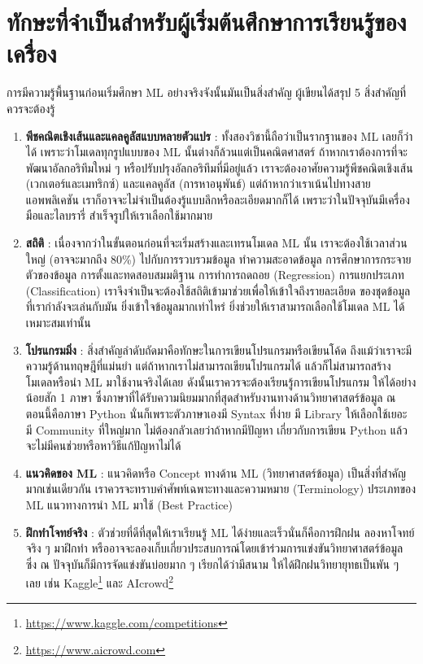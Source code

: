 \section{ทักษะที่จำเป็นสำหรับผู้เริ่มต้นศึกษาการเรียนรู้ของเครื่อง}

การมีความรู้พื้นฐานก่อนเริ่มศึกษา ML อย่างจริงจังนั้นมันเป็นสิ่งสำคัญ ผู้เขียนได้สรุป 5 สิ่งสำคัญที่ควรจะต้องรู้ 

\begin{enumerate}
    \item \textbf{พีชคณิตเชิงเส้นและแคลคูลัสแบบหลายตัวแปร} : ทั้งสองวิชานี้ถือว่าเป็นรากฐานของ ML เลยก็ว่าได้ 
    เพราะว่าโมเดลทุกรูปแบบของ ML นั้นต่างก็ล้วนแต่เป็นคณิตศาสตร์ ถ้าหากเราต้องการที่จะพัฒนาอัลกอริทึมใหม่ ๆ 
    หรือปรับปรุงอัลกอริทึมที่มีอยู่แล้ว เราจะต้องอาศัยความรู้พีชคณิตเชิงเส้น (เวกเตอร์และเมทริกซ์) และแคลคูลัส (การหาอนุพันธ์) 
    แต่ถ้าหากว่าเราเน้นไปทางสายแอพพลิเคชัน เราก็อาจจะไม่จำเป็นต้องรู้แบบลึกหรือละเอียดมากก็ได้ เพราะว่าในปัจจุบันมีเครื่องมือและไลบรารี่%
    สำเร็จรูปให้เราเลือกใช้มากมาย
    \item \textbf{สถิติ} : เนื่องจากว่าในขั้นตอนก่อนที่จะเริ่มสร้างและเทรนโมเดล ML นั้น เราจะต้องใช้เวลาส่วนใหญ่ 
    (อาจจะมากถึง 80\%) ไปกับการรวบรวมข้อมูล ทำความสะอาดข้อมูล การศึกษาการกระจายตัวของข้อมูล การตั้งและทดสอบสมมติฐาน 
    การทำการถดถอย (Regression) การแยกประเภท (Classification) เราจึงจำเป็นจะต้องใช้สถิติเข้ามาช่วยเพื่อให้เข้าใจถึงรายละเอียด
    ของชุดข้อมูลที่เรากำลังจะเล่นกับมัน ยิ่งเข้าใจข้อมูลมากเท่าไหร่ ยิ่งช่วยให้เราสามารถเลือกใช้โมเดล ML ได้เหมาะสมเท่านั้น 
    \item \textbf{โปรแกรมมิ่ง} : สิ่งสำคัญลำดับถัดมาคือทักษะในการเขียนโปรแกรมหรือเขียนโค้ด ถึงแม้ว่าเราจะมีความรู้ด้านทฤษฎีที่แม่นยำ 
    แต่ถ้าหากเราไม่สามารถเขียนโปรแกรมได้ แล้วก็ไม่สามารถสร้างโมเดลหรือนำ ML มาใช้งานจริงได้เลย ดังนั้นเราควรจะต้องเรียนรู้การเขียนโปรแกรม
    ให้ได้อย่างน้อยสัก 1 ภาษา ซึ่งภาษาที่ได้รับความนิยมมากที่สุดสำหรับงานทางด้านวิทยาศาสตร์ข้อมูล ณ ตอนนี้คือภาษา Python 
    นั่นก็เพราะตัวภาษาเองมี Syntax ที่ง่าย มี Library ให้เลือกใช้เยอะ มี Community ที่ใหญ่มาก ไม่ต้องกลัวเลยว่าถ้าหากมีปัญหา%
    เกี่ยวกับการเขียน Python แล้วจะไม่มีคนช่วยหรือหาวิธีแก้ปัญหาไม่ได้
    \item \textbf{แนวคิดของ ML} : แนวคิดหรือ Concept ทางด้าน ML (วิทยาศาสตร์ข้อมูล) เป็นสิ่งที่สำคัญมากเช่นเดียวกัน
    เราควรจะทราบคำศัพท์เฉพาะทางและความหมาย (Terminology) ประเภทของ ML แนวทางการนำ ML มาใช้ (Best Practice)
    \item \textbf{ฝึกทำโจทย์จริง} : ตัวช่วยที่ดีที่สุดให้เราเรียนรู้ ML ได้ง่ายและเร็วนั่นก็คือการฝึกฝน ลองหาโจทย์จริง ๆ มาฝึกทำ
    หรืออาจจะลองเก็บเกี่ยวประสบการณ์โดยเข้าร่วมการแข่งขันวิทยาศาสตร์ข้อมูล ซึ่ง ณ ปัจจุบันก็มีการจัดแข่งขันบ่อยมาก ๆ เรียกได้ว่ามีสนาม
    ให้ได้ฝึกฝนวิทยายุทธเป็นพัน ๆ เลย เช่น Kaggle\footnote{\url{https://www.kaggle.com/competitions}} และ
    AIcrowd\footnote{\url{https://www.aicrowd.com}} 
\end{enumerate}

